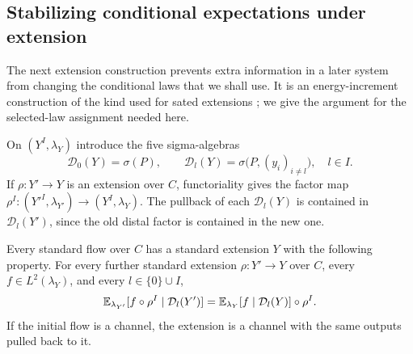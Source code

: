 \subsection{Stabilizing conditional expectations under extension}

The next extension construction prevents extra information in a later
system from changing the conditional laws that we shall use. It is an
energy-increment construction of the kind used for sated extensions
\cite[Theorem~3.11 and Lemma~3.12]{Austin}; we give the argument for the selected-law assignment
needed here.

On $(Y^I,\lambda_Y)$ introduce the five sigma-algebras
\begin{equation}\label{eq:saturation-data}
 \mathcal D_0(Y)=\sigma(P),\qquad
 \mathcal D_l(Y)=\sigma\bigl(P,(y_i)_{i\ne l}\bigr),\quad l\in I.
\end{equation}
If $\rho:Y'\to Y$ is an extension over $C$, functoriality gives the
factor map $\rho^I:(Y'^I,\lambda_{Y'})\to(Y^I,\lambda_Y)$.
The pullback of each $\mathcal D_l(Y)$ is contained in
$\mathcal D_l(Y')$, since the old distal factor is contained in the
new one.

\begin{proposition}\label{prop:saturation}
Every standard flow over $C$ has a standard extension $Y$ with the
following property. For every further standard extension
$\rho:Y'\to Y$ over $C$, every $f\in L^2(\lambda_Y)$, and every
$l\in\{0\}\cup I$,
\begin{equation}\label{eq:saturation-identity}
 \mathbb E_{\lambda_{Y'}}[f\circ\rho^I\mid\mathcal D_l(Y')]
 =\mathbb E_{\lambda_Y}[f\mid\mathcal D_l(Y)]\circ\rho^I.
\end{equation}
If the initial flow is a channel, the extension is a channel with the
same outputs pulled back to it.
\end{proposition}


